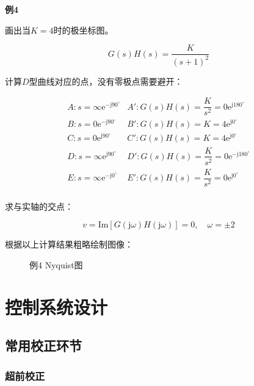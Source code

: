 \documentclass[cn, blue, normal, 12pt]{elegantnote}
\begin{document}
\textbf{例4}

画出当$K=4$时的极坐标图。

\begin{equation}
    G(s)H(s)=\frac{K}{(s+1)^2}
\end{equation}

计算$D$型曲线对应的点，没有零极点需要避开：

\begin{equation}
    \begin{array}{ll}
        A: s=\infty\mathrm{e}^{-\mathrm{j}90^{\circ}} & 
        A': G(s)H(s)=\dfrac{K}{s^2}=0\mathrm{e}^{\mathrm{j}180^{\circ}} \\
        B: s=0\mathrm{e}^{-\mathrm{j}90^{\circ}} & 
        B': G(s)H(s)=K=4\mathrm{e}^{\mathrm{j}0^{\circ}} \\
        C: s=0\mathrm{e}^{\mathrm{j}90^{\circ}} & 
        C': G(s)H(s)=K=4\mathrm{e}^{\mathrm{j}0^{\circ}} \\
        D: s=\infty\mathrm{e}^{\mathrm{j}90^{\circ}} & 
        D': G(s)H(s)=\dfrac{K}{s^2}=0\mathrm{e}^{-\mathrm{j}180^{\circ}} \\
        E: s=\infty\mathrm{e}^{-\mathrm{j}0^{\circ}} & 
        E': G(s)H(s)=\dfrac{K}{s^2}=0\mathrm{e}^{\mathrm{j}0^{\circ}} \\
    \end{array}
\end{equation}

求与实轴的交点：

\begin{equation}
    v=\mathrm{Im}[G(\mathrm{j}\omega)H(\mathrm{j}\omega)]=0, \quad \omega=\pm 2
\end{equation}

根据以上计算结果粗略绘制图像：

\begin{figure}[htbp]
    \centering
    
    \caption{例4 Nyquist图}
\end{figure}

\section{控制系统设计}

\subsection{常用校正环节}

\subsubsection{超前校正}
\end{document}
